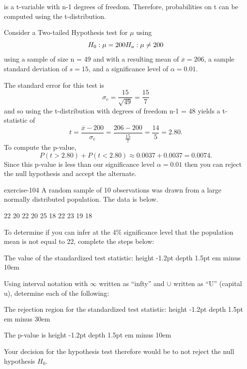 \documentclass[10pt,]{book}
\newcommand{\fillin}[1]{\leavevmode\leaders\vrule height -1.2pt depth 1.5pt \hskip #1em minus #1em \null}
\numberwithin{equation}{section}
\newcommand{\lt}{<}
\newcommand{\gt}{>}
\begin{document}
is a t-variable with n-1 degrees of freedom. Therefore, probabilities on t can be computed using the t-distribution.%
\par
\hypertarget{p-1476}{}%
Consider a Two-tailed Hypothesis test for \(\mu\) using%
\begin{equation*}
H_0 : \mu = 200 \\ H_a: \mu \neq 200
\end{equation*}
using a sample of size n = 49 and with a resulting mean of \(\overline{x} = 206\), a sample standard deviation of \(s = 15\), and a significance level of \(\alpha = 0.01\).%
\par
\hypertarget{p-1477}{}%
The standard error for this test is%
\begin{equation*}
\sigma_e = \frac{15}{\sqrt{49}} = \frac{15}{7}
\end{equation*}
and so using the t-distribution with degrees of freedom n-1 = 48 yields a t-statistic of%
\begin{equation*}
t = \frac{\overline{x} - 200}{\sigma_e} = \frac{206-200}{\frac{15}{7}} = \frac{14}{5} = 2.80.
\end{equation*}
To compute the p-value,%
\begin{equation*}
P(t \gt 2.80) + P(t \lt 2.80) \approx 0.0037 + 0.0037 = 0.0074.
\end{equation*}
Since this p-value is less than our significance level \(\alpha = 0.01\) then you can reject the null hypothesis and accept the alternate.%
\par
\hypertarget{p-1478}{}%
\begin{inlineexercise}{}{exercise-104}%
\hypertarget{p-1487}{}%
A random sample of 10 observations was drawn from a large normally distributed population. The data is below.%
\par
\hypertarget{p-1488}{}%
22 20 22 20 25 18 22 23 19 18%
\par
\hypertarget{p-1489}{}%
To determine if you can infer at the 4\% significance level that the population mean is not equal to 22, complete the steps below:%
\par
\hypertarget{p-1490}{}%
The value of the standardized test statistic:  \fillin{10}%
\par
\hypertarget{p-1491}{}%
Using interval notation with \(\infty\) written as ``infty'' and \(\cup\) written as ``U'' (capital u), determine each of the following:%
\par
\hypertarget{p-1492}{}%
The rejection region for the standardized test statistic:  \fillin{30}%
\par
\hypertarget{p-1493}{}%
The p-value is  \fillin{10}%
\par
\hypertarget{p-1494}{}%
Your decision for the hypothesis test therefore would be to not reject the null hypothesis \(H_0\text{.}\)%
\end{inlineexercise}
\end{document}
